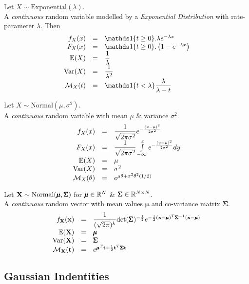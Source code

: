 \documentclass[11pt,a4paper]{article}
\begin{document}
Let $X\sim\text{Exponential}(\lambda)$.\\
A \textit{continuous} random variable modelled by a \textit{Exponential Distribution} with rate-parameter $\lambda$. Then
\[\begin{array}{rcl}
f_X(x)&=&\indicator\{t\geq0\}.\lambda e^{-\lambda x}\\
F_X(x)&=&\indicator\{t\geq0\}.\left(1-e^{-\lambda x}\right)\\
\expect(X)&=&\dfrac{1}{\lambda}\\
\var(X)&=&\dfrac{1}{\lambda^2}\\
\mathcal{M}_X(t)&=&\indicator\{t<\lambda\}\dfrac{\lambda}{\lambda-t}
\end{array}\]

Let $X\sim\text{Normal}(\mu,\sigma^2)$.\\
A \textit{continuous} random variable  with mean $\mu$ \& variance $\sigma^2$.
\[\begin{array}{rcl}
f_X(x)&=&\dfrac{1}{\sqrt{2\pi\sigma^2}}e^{-\frac{(x-\mu)^2}{2\sigma^2}}\\
F_X(x)&=&\dfrac{1}{\sqrt{2\pi\sigma^2}}\int\limits_{-\infty}^xe^{-\frac{(y-\mu)^2}{2\sigma^2}}dy\\
\mathbb{E}(X)&=&\mu\\
\mathrm{Var}(X)&=&\sigma^2\\
\mathcal{M}_X(\theta)&=&e^{\mu\theta+\sigma^2\theta^2(1/2)}
\end{array}\]

Let $\textbf{X}\sim\text{Normal}(\pmb\mu,\pmb\Sigma)$ for $\pmb\mu\in\mathbb{R}^N$ \& $\pmb\Sigma\in\mathbb{R}^{N\times N}$.\\
A \textit{continuous} random vector with mean values $\pmb\mu$ and co-variance matrix $\pmb\Sigma$.
\[\begin{array}{rcl}
f_{\textbf{X}}(\textbf{x})&=&\dfrac{1}{(\sqrt{2\pi})^k}\text{det}(\pmb\Sigma)^{-\frac{1}{2}}e^{-\frac{1}{2}(\textbf{x}-\pmb\mu)^T\pmb\Sigma^{-1}(\textbf{x}-\pmb\mu)}\\
\mathbb{E}(\textbf{X})&=&\pmb\mu\\
\mathrm{Var}(\textbf{X})&=&\pmb\Sigma\\
\mathcal{M}_{\textbf{X}}(\textbf{t})&=&e^{\pmb\mu^T\textbf{t}+\frac{1}{2}\textbf{t}^T\pmb\Sigma\textbf{t}}
\end{array}\]

\subsection{Gaussian Indentities}
\end{document}
